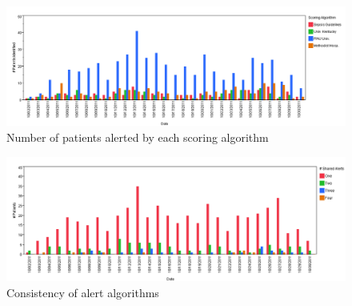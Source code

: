 \documentclass{sig-alternate}
\begin{document}
\begin{figure}
	\begin{center}
		\includegraphics[width=1.0\linewidth]{NumPatientsComp.png}
	\end{center}
	\caption{Number of patients alerted by each scoring algorithm}
	\label{fig:num_patients}
\end{figure}

\begin{figure}
	\begin{center}
		\includegraphics[width=1.0\linewidth]{ScoringComparision_Similarities.png}
	\end{center}
	\caption{Consistency of alert algorithms}
	\label{fig:num_alerts}
\end{figure}
\end{document}

